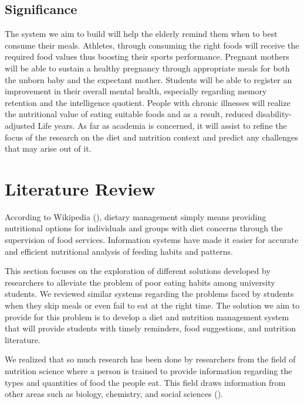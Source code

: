 \documentclass{article}
\begin{document}
\subsection{Significance}
The system we aim to build will help the elderly remind them when to best consume their meals. Athletes, through consuming the right foods will receive the required food values thus boosting their sports performance. Pregnant mothers will be able to sustain a healthy pregnancy through appropriate meals for both the unborn baby and the expectant mother. Students will be able to register an improvement in their overall mental health, especially regarding memory retention and the intelligence quotient.  People with chronic illnesses will realize the nutritional value of eating suitable foods and as a result, reduced disability-adjusted Life years. As far as academia is concerned, it will assist to refine the focus of the research on the diet and nutrition context and predict any challenges that may arise out of it.


\newpage
\section{Literature Review}

According to Wikipedia (\citeyear{wikipedia2019dietary}), dietary management simply means providing nutritional options for individuals and groups with diet concerns through the supervision of food services. Information systems have made it easier for accurate and efficient nutritional analysis of feeding habits and patterns.

This section focuses on the exploration of different solutions developed by researchers to alleviate the problem of poor eating habits among university students. We reviewed similar systems regarding the problems faced by students when they skip meals or even fail to eat at the right time. The solution we aim to provide for this problem is to develop a diet and nutrition management system that will provide students with timely reminders, food suggestions, and nutrition literature.

We realized that so much research has been done by researchers from the field of nutrition science where a person is trained to provide information regarding the types and quantities of food the people eat. This field draws information from other areas such as biology, chemistry, and social sciences (\cite{sriram2020hire}).
\end{document}
